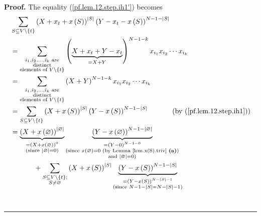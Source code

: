 \documentclass[numbers=enddot,12pt,final,onecolumn,notitlepage]{scrartcl}%
\theoremstyle{definition}
\newenvironment{proof}[1][Proof]{\noindent\textbf{#1.} }{\ \rule{0.5em}{0.5em}}
\let\sumnonlimits\sum
\renewcommand{\sum}{\sumnonlimits\limits}
\newenvironment{verlong}{}{}
\begin{document}
\begin{verlong}
\begin{proof}
The equality (\ref{pf.lem.12.step.ih1'}) becomes%
\begin{align}
&  \sum_{S\subseteq V\setminus\left\{  t\right\}  }\left(  X+x_{t}+x\left(
S\right)  \right)  ^{\left\vert S\right\vert }\left(  Y-x_{t}-x\left(
S\right)  \right)  ^{N-1-\left\vert S\right\vert }\nonumber\\
&  =\sum_{\substack{i_{1},i_{2},\ldots,i_{k}\text{ are}\\\text{distinct}%
\\\text{elements of }V\setminus\left\{  t\right\}  }}\left(
\underbrace{X+x_{t}+Y-x_{t}}_{=X+Y}\right)  ^{N-1-k}x_{i_{1}}x_{i_{2}}\cdots
x_{i_{k}}\nonumber\\
&  =\sum_{\substack{i_{1},i_{2},\ldots,i_{k}\text{ are}\\\text{distinct}%
\\\text{elements of }V\setminus\left\{  t\right\}  }}\left(  X+Y\right)
^{N-1-k}x_{i_{1}}x_{i_{2}}\cdots x_{i_{k}}\label{pf.lem.12.step.ih1=1'o}\\
&  =\sum_{S\subseteq V\setminus\left\{  t\right\}  }\left(  X+x\left(
S\right)  \right)  ^{\left\vert S\right\vert }\left(  Y-x\left(  S\right)
\right)  ^{N-1-\left\vert S\right\vert }\ \ \ \ \ \ \ \ \ \ \left(  \text{by
(\ref{pf.lem.12.step.ih1})}\right) \label{pf.lem.12.step.ih1=1'}\\
&  =\underbrace{\left(  X+x\left(  \varnothing\right)  \right)  ^{\left\vert
\varnothing\right\vert }}_{\substack{=\left(  X+x\left(  \varnothing\right)
\right)  ^{0}\\\text{(since }\left\vert \varnothing\right\vert =0\text{)}%
}}\underbrace{\left(  Y-x\left(  \varnothing\right)  \right)  ^{N-1-\left\vert
\varnothing\right\vert }}_{\substack{=\left(  Y-0\right)  ^{N-1-0}%
\\\text{(since }x\left(  \varnothing\right)  =0\text{ (by Lemma
\ref{lem.x(S).triv} \textbf{(a)})}\\\text{and }\left\vert \varnothing
\right\vert =0\text{)}}}\nonumber\\
&  \ \ \ \ \ \ \ \ \ \ +\sum_{\substack{S\subseteq V\setminus\left\{
t\right\}  ;\\S\neq\varnothing}}\left(  X+x\left(  S\right)  \right)
^{\left\vert S\right\vert }\underbrace{\left(  Y-x\left(  S\right)  \right)
^{N-1-\left\vert S\right\vert }}_{\substack{=\left(  Y-x\left(  S\right)
\right)  ^{N-\left\vert S\right\vert -1}\\\text{(since }N-1-\left\vert
S\right\vert =N-\left\vert S\right\vert -1\text{)}}}\nonumber\\

\end{align}
\end{proof}
\end{verlong}
\end{document}
